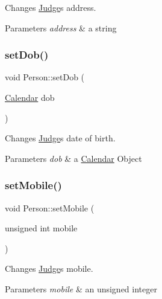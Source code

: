 Changes \hyperlink{class_judge}{Judge}\textquotesingle{}s address. 


\begin{DoxyParams}{Parameters}
{\em address} & a string \\
\hline
\end{DoxyParams}
\mbox{\label{class_person_afd8a9d5081dc37de47bb97963b984b7e}} 
\subsubsection{\texorpdfstring{set\+Dob()}{setDob()}}
{\footnotesize\ttfamily void Person\+::set\+Dob (\begin{DoxyParamCaption}\item[{\hyperlink{class_calendar}{Calendar}}]{dob }\end{DoxyParamCaption})}



Changes \hyperlink{class_judge}{Judge}\textquotesingle{}s date of birth. 


\begin{DoxyParams}{Parameters}
{\em dob} & a \hyperlink{class_calendar}{Calendar} Object \\
\hline
\end{DoxyParams}
\mbox{\label{class_person_afa108f8231d33585e5801320a18dbb08}} 
\subsubsection{\texorpdfstring{set\+Mobile()}{setMobile()}}
{\footnotesize\ttfamily void Person\+::set\+Mobile (\begin{DoxyParamCaption}\item[{unsigned int}]{mobile }\end{DoxyParamCaption})}



Changes \hyperlink{class_judge}{Judge}\textquotesingle{}s mobile. 


\begin{DoxyParams}{Parameters}
{\em mobile} & an unsigned integer \\
\hline
\end{DoxyParams}
\mbox{\label{class_person_ad6e438f456d3ae6f5b477931c0a6aeba}} 
